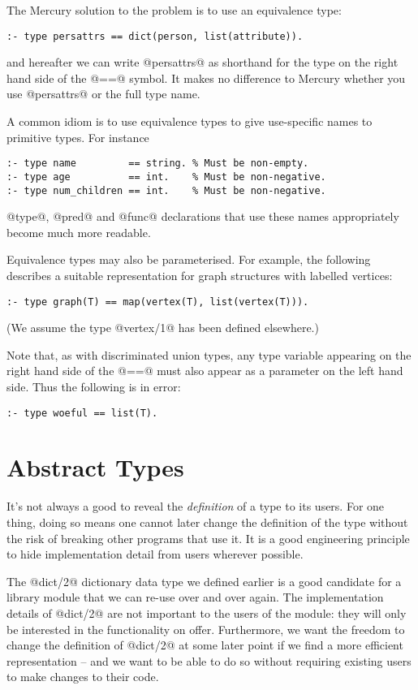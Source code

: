 The Mercury solution to the problem is to use an equivalence type:
\begin{verbatim}
:- type persattrs == dict(person, list(attribute)).
\end{verbatim}
and hereafter we can write @persattrs@ as shorthand for the type on the
right hand side of the @==@ symbol.  It makes no difference to Mercury
whether you use @persattrs@ or the full type name.

A common idiom is to use equivalence types to give use-specific names
to primitive types.  For instance
\begin{verbatim}
:- type name         == string. % Must be non-empty.
:- type age          == int.    % Must be non-negative.
:- type num_children == int.    % Must be non-negative.
\end{verbatim}
@type@, @pred@ and @func@ declarations that use these names
appropriately become much more readable.

Equivalence types may also be parameterised.  For example, the following
describes a suitable representation for graph structures with labelled
vertices:
\begin{verbatim}
:- type graph(T) == map(vertex(T), list(vertex(T))).
\end{verbatim}
(We assume the type @vertex/1@ has been defined elsewhere.)

Note that, as with discriminated union types, any type variable appearing on
the right hand side of the @==@ must also appear as a parameter on the left
hand side.  Thus the following is in error:
\begin{verbatim}
:- type woeful == list(T).
\end{verbatim}

\section{Abstract Types}

It's not always a good to reveal the \emph{definition} of a type to its
users.  For one thing, doing so means one cannot later change the
definition of the type without the risk of breaking other programs that use
it.  It is a good engineering principle to hide 
implementation detail from users wherever possible.

The @dict/2@ dictionary data type we defined earlier is a good candidate
for a library module that we can re-use over and over again.  The
implementation details of @dict/2@ are not important to the users of the
module: they will only be interested in the functionality on offer.
Furthermore, we want the freedom to change the definition of @dict/2@ at
some later point if we find a more efficient representation -- and we want
to be able to do so without requiring existing users to make changes to
their code.

